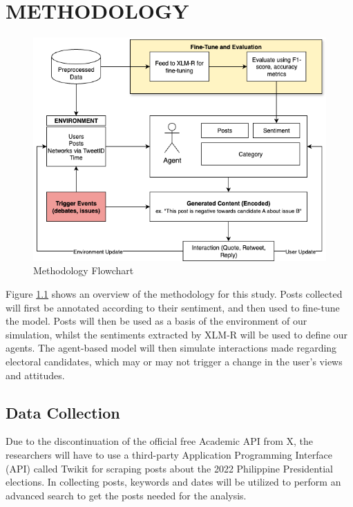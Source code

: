 \chapter{METHODOLOGY}

\begin{figure}[h]
    \centering
    \includegraphics[width=1\textwidth]{Figures/FlowofMethodology.png}
    \caption{Methodology Flowchart}
    \label{fig:Methodology}
\end{figure}

Figure \ref{fig:Methodology} shows an overview of the methodology for this study. Posts collected will first be annotated according to their sentiment, and then used to fine-tune the model. Posts will then be used as a basis of the environment of our simulation, whilst the sentiments extracted by XLM-R will be used to define our agents. The agent-based model will then simulate interactions made regarding electoral candidates, which may or may not trigger a change in the user’s views and attitudes.

\section{Data Collection}
Due to the discontinuation of the official free Academic API from X, the researchers will have to use a third-party Application Programming Interface (API) called Twikit for scraping posts about the 2022 Philippine Presidential elections. In collecting posts, keywords and dates will be utilized to perform an advanced search to get the posts needed for the analysis.\newline

